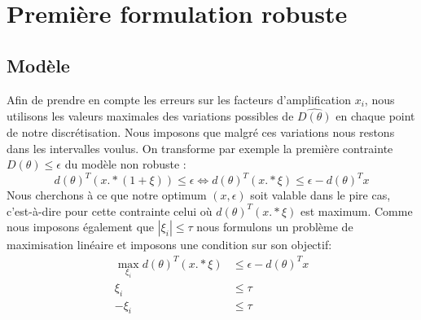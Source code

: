 \section{Première formulation robuste}
\subsection{Modèle}

Afin de prendre en compte les erreurs sur les facteurs d'amplification $x_i$, nous utilisons les valeurs maximales des variations possibles de $\hat{D(\theta)}$ en chaque point de notre discrétisation. Nous imposons que malgré ces variations nous restons dans les intervalles voulus. On transforme par exemple la première contrainte $D(\theta)\leq \epsilon$ du modèle non robuste :
\begin{equation}
d(\theta)^T (x.*(1+\xi)) \leq \epsilon \Longleftrightarrow d(\theta)^T (x.*\xi) \leq \epsilon- d(\theta)^T x
\end{equation}
Nous cherchons à ce que notre optimum $(x,\epsilon)$ soit valable dans le pire cas, c'est-à-dire pour cette contrainte celui où $d(\theta)^T (x.*\xi)$ est maximum. Comme nous imposons également que $|\xi_i|\leq \tau$ nous formulons un problème de maximisation linéaire et imposons une condition sur son objectif: 
\begin{align*}
\max_{\xi_i} d(\theta)^T (x.*\xi)  & \leq \epsilon- d(\theta)^T x \\
\xi_i & \leq \tau \\
-\xi_i & \leq \tau 
\end{align*} 

